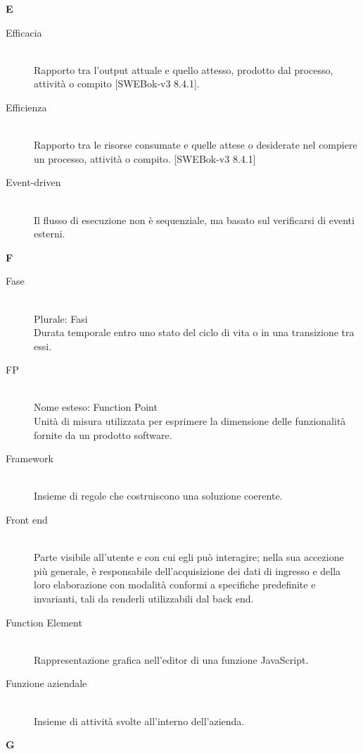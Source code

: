 \newpage 
\begin{center}\textbf{\Huge{E}}\end{center}
\begin{description}\item[Efficacia] \hfill \\
Rapporto tra l'output attuale e quello attesso, prodotto dal processo, attività o compito [SWEBok-v3 8.4.1].
 \item[Efficienza] \hfill \\
Rapporto tra le risorse consumate e quelle attese o desiderate nel compiere un processo, attività o compito. [SWEBok-v3 8.4.1]
 \item[Event-driven] \hfill \\
Il flusso di esecuzione non è sequenziale, ma basato sul verificarsi di eventi esterni.
 \end{description}
\newpage 
\begin{center}\textbf{\Huge{F}}\end{center}
\begin{description}\item[Fase] \hfill \\
Plurale: Fasi\\ 
Durata temporale entro uno stato del ciclo di vita o in una transizione tra essi.
 \item[FP] \hfill \\
Nome esteso: Function Point\\ 
Unità di misura utilizzata per esprimere la dimensione delle funzionalità fornite da un prodotto software.
 \item[Framework] \hfill \\
Insieme di regole che costruiscono una soluzione coerente.
 \item[Front end] \hfill \\
Parte visibile all'utente e con cui egli può interagire; nella sua accezione più generale, è responsabile dell'acquisizione dei dati di ingresso e della loro elaborazione con modalità conformi a specifiche predefinite e invarianti, tali da renderli utilizzabili dal back end.
 \item[Function Element] \hfill \\
Rappresentazione grafica nell'editor di una funzione JavaScript.
 \item[Funzione aziendale] \hfill \\
Insieme di attività svolte all'interno dell'azienda.
 \end{description}
\newpage 
\begin{center}\textbf{\Huge{G}}\end{center}
